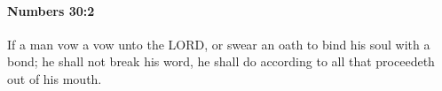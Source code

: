 
		\paragraph{Numbers 30:2} %
			\label{NUMBERS-30-2}

			If a man vow a vow unto the LORD, or swear an oath to bind his soul with a bond; he shall not break his word, he shall do according to all that proceedeth out of his mouth.



